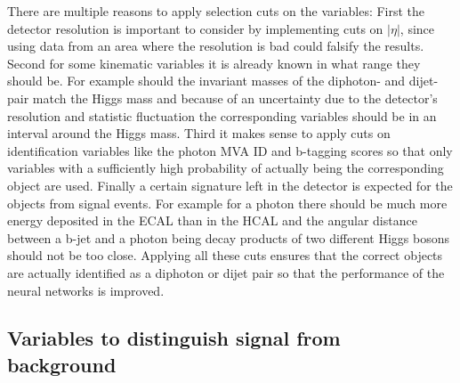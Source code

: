 

There are multiple reasons to apply selection cuts on the variables:
First the detector resolution is important to consider by implementing cuts on $| \eta |$, since using data from an area where the resolution is bad could falsify the results.
Second for some kinematic variables it is already known in what range they should be. For example should the invariant masses of the diphoton- and dijet-pair match the Higgs mass and because of
an uncertainty due to the detector's resolution and statistic fluctuation the corresponding variables should be in an interval around the Higgs mass.
Third it makes sense to apply cuts on identification variables like the photon MVA ID and b-tagging scores so that only variables with a sufficiently high probability of actually being the corresponding object are used. 
Finally a certain signature left in the detector is expected for the objects from signal events. For example for a photon there should be much more energy deposited in the ECAL than in the HCAL and 
the angular distance between a b-jet and a photon being decay products of two different Higgs bosons should not be too close.
Applying all these cuts ensures that the correct objects are actually identified as a diphoton or dijet pair so that the performance of the neural networks is improved.

\subsection{Variables to distinguish signal from background}
\label{sec:trainvar}

